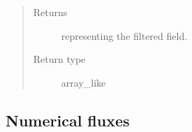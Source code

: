 \documentclass[letterpaper,10pt,english]{sphinxmanual}
\begin{document}
\begin{fulllineitems}
\begin{fulllineitems}
\begin{quote}
\begin{description}
\item[{Returns}] \leavevmode
{} representing the filtered field.

\item[{Return type}] \leavevmode
array\_like

\end{description}\end{quote}

\end{fulllineitems}


\end{fulllineitems}



\subsection{Numerical fluxes}
\label{\detokenize{api:numerical-fluxes}}
\end{document}
